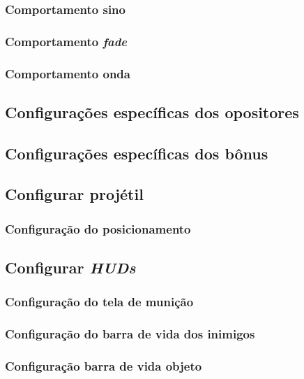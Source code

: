\documentclass[12pt,twoside,openright,a4paper,english,brazil,sumario=tradicional]{abntex2}
\begin{document}
\begin{anexosenv}
   \subsubsection{Comportamento sino}


   \subsubsection{Comportamento \emph{fade}}


   \subsubsection{Comportamento onda}


   \subsection{Configurações específicas dos opositores}


   \subsection{Configurações específicas dos bônus}


   \subsection{Configurar projétil}


   \subsubsection{Configuração do posicionamento}


   \subsection{Configurar \emph{HUDs}}


   \subsubsection{Configuração do tela de munição}


   \subsubsection{Configuração do barra de vida dos inimigos}


   \subsubsection{Configuração barra de vida objeto}



\end{anexosenv}
\end{document}
